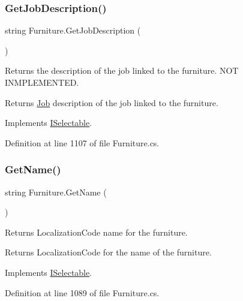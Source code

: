 \subsubsection{\texorpdfstring{Get\+Job\+Description()}{GetJobDescription()}}
{\footnotesize\ttfamily string Furniture.\+Get\+Job\+Description (\begin{DoxyParamCaption}{ }\end{DoxyParamCaption})}



Returns the description of the job linked to the furniture. N\+OT I\+N\+M\+P\+L\+E\+M\+E\+N\+T\+ED. 

\begin{DoxyReturn}{Returns}
\hyperlink{class_job}{Job} description of the job linked to the furniture.
\end{DoxyReturn}


Implements \hyperlink{interface_i_selectable_a4d0f9fa51a3d70a7fbcbb39e126e4c73}{I\+Selectable}.



Definition at line 1107 of file Furniture.\+cs.

\mbox{\label{class_furniture_a4cca1807f72cdf61fe438976db5ecf9c}} 
\subsubsection{\texorpdfstring{Get\+Name()}{GetName()}}
{\footnotesize\ttfamily string Furniture.\+Get\+Name (\begin{DoxyParamCaption}{ }\end{DoxyParamCaption})}



Returns Localization\+Code name for the furniture. 

\begin{DoxyReturn}{Returns}
Localization\+Code for the name of the furniture.
\end{DoxyReturn}


Implements \hyperlink{interface_i_selectable_af676ba50e2cd5839438d3092743a79da}{I\+Selectable}.



Definition at line 1089 of file Furniture.\+cs.

\mbox{\label{class_furniture_aa6e7a8ac556cf6b05148257752bb5a58}} 
